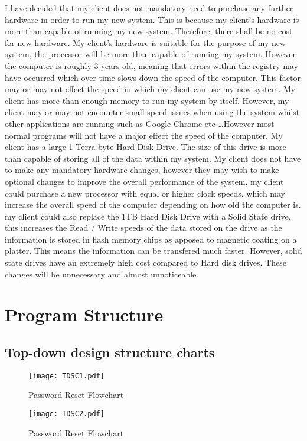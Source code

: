 I have decided that my client does not mandatory need to purchase any further hardware in order to run my new system. This is because my client's hardware is more than capable of running my new system. Therefore, there shall be no cost for new hardware. My client's hardware is suitable for the purpose of my new system, the processor will be more than capable of running my system. However the computer is roughly 3 years old, meaning that errors within the registry may have occurred which over time slows down the speed of the computer. This factor may or may not effect the speed in which my client can use my new system. My client has more than enough memory to run my system by itself. However, my client may or may not encounter small speed issues when using the system whilst other applications are running such as Google Chrome etc \ldots However most normal programs will not have a major effect the speed of the computer.  My client has a large 1 Terra-byte Hard Disk Drive. The size of this drive is more than capable of storing all of the data within my system. My client does not have to make any mandatory hardware changes, however they may wish to make optional changes to improve the overall performance of the system. my client could purchase a new processor with equal or higher clock speeds, which may increase the overall speed of the computer depending on how old the computer is.  my client could also replace the 1TB Hard Disk Drive with a Solid State drive, this increases the Read / Write speeds of the data stored on the drive as the information is stored in flash memory chips as apposed to magnetic coating on a platter. This means the information can be transfered much faster. However, solid state drives have an extremely high cost compared to Hard disk drives. These changes will be unnecessary and almost unnoticeable.

\section{Program Structure}


\subsection{Top-down design structure charts}

\begin{landscape}
\begin{figure}[H]
\caption{Password Reset Flowchart} \label{fig:Password Reset Flowchart}
\hfill\texttt{[image: TDSC1.pdf]}\hspace*{\fill}
\end{figure}



\begin{figure}[H]
\caption{Password Reset Flowchart} \label{fig:Password Reset Flowchart}
\hfill\texttt{[image: TDSC2.pdf]}\hspace*{\fill}
\end{figure}
\end{landscape}


